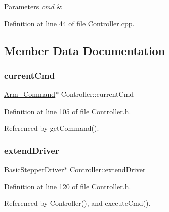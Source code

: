 \begin{DoxyParams}{Parameters}
{\em cmd} & \\
\hline
\end{DoxyParams}


Definition at line 44 of file Controller.\+cpp.



\subsection{Member Data Documentation}
\mbox{\label{class_controller_a809d8cb0ecbccb5740b8f72bbed8dd32}} 
\subsubsection{\texorpdfstring{current\+Cmd}{currentCmd}}
{\footnotesize\ttfamily \hyperlink{class_controller_a1b06b7601d97a4d4bb4071938df87076}{Arm\+\_\+\+Command}$\ast$ Controller\+::current\+Cmd\hspace{0.3cm}{\ttfamily [private]}}



Definition at line 105 of file Controller.\+h.



Referenced by get\+Command().

\mbox{\label{class_controller_a269efb6c442129f6f5f9aca4450d2258}} 
\subsubsection{\texorpdfstring{extend\+Driver}{extendDriver}}
{\footnotesize\ttfamily Basic\+Stepper\+Driver$\ast$ Controller\+::extend\+Driver\hspace{0.3cm}{\ttfamily [private]}}



Definition at line 120 of file Controller.\+h.



Referenced by Controller(), and execute\+Cmd().

\mbox{\label{class_controller_ac48c7b82c23ccff1ffe3ba34225aff41}} 
